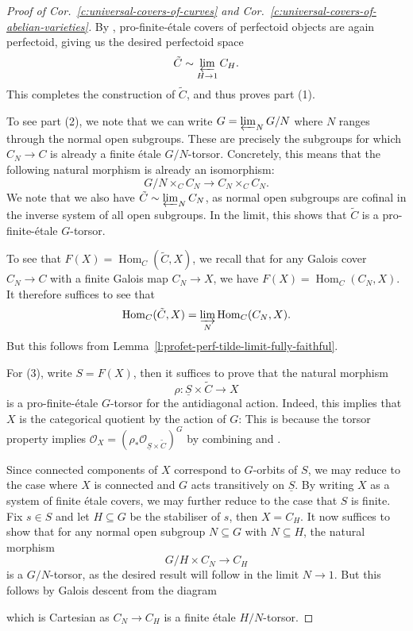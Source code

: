 \documentclass[10pt,oneside]{amsart}
\theoremstyle{definition}
\newcommand{\Hom}{\operatorname{Hom}}
\renewcommand{\O}{\mathcal{O}}
\begin{document}
\begin{proof}[Proof of Cor.~\ref{c:universal-covers-of-curves} and Cor.~\ref{c:universal-covers-of-abelian-varieties}]
By \cite[Lemma 4.6]{p-adic_Hodge}, pro-finite-\'etale covers of perfectoid objects are again perfectoid, giving us the desired perfectoid space 
\[ \tilde{C}\sim\varprojlim_{H\rightarrow 1} C_H.\]
This completes the construction of $\tilde{C}$, and thus proves part (1).

To see part (2), we note that we can write $G=\varprojlim_N G/N$ where $N$ ranges through the normal open subgroups. These are precisely the subgroups for which $C_N\to C$ is already a finite \'etale $G/N$-torsor. Concretely, this means that the following natural morphism is already an isomorphism:
\[G/N\times_C C_N\to C_N\times_CC_N.\]
We note that we also have $\tilde{C} \sim \varprojlim_NC_N$, as normal open subgroups are cofinal in the inverse system of all open subgroups. In the limit, this shows that $\tilde{C}$ is a pro-finite-\'etale $G$-torsor.

To see that $F(X)=\Hom_C(\tilde{C},X)$, we recall that for any Galois cover $C_N\to C$ with a finite Galois map $C_N\to X$, we have $F(X)=\Hom_C(C_N,X)$. It therefore suffices to see that
\[\Hom_C(\tilde{C},X)=\varinjlim_{N}\Hom_C(C_N,X).\]
But this follows from Lemma~\ref{l:profet-perf-tilde-limit-fully-faithful}.

For (3), write $S=F(X)$, then it suffices to prove that the natural morphism \[\rho:\underline{S}\times\tilde{C}\to X\]
is a pro-finite-\'etale $G$-torsor for the antidiagonal action. Indeed, this implies that $X$ is the categorical quotient by the action of $G$: This is because the torsor property implies $\O_X = (\rho_{\ast}\O_{\underline{S}\times\tilde{C}})^{G}$ by combining \cite[{Lemma~2.24}]{CHJ} and \cite[{Theorem~8.2.3}]{KedlayaLiu-II}.

 Since connected components of $X$ correspond to $G$-orbits of $S$, we may reduce to the case where $X$ is connected and $G$ acts transitively on $\underline{S}$. By writing $X$ as a system of finite \'etale covers, we may further reduce to the case that $S$ is finite.  Fix $s\in S$ and let $H\subseteq G$ be the stabiliser of $s$, then $X=C_H$. It now suffices to show that for any normal open subgroup $N\subseteq G$ with $N\subseteq H$, the natural morphism
\[G/H\times C_N\to C_H\]
is a $G/N$-torsor, as the desired result will follow in the limit $N\to 1$. But this follows by Galois descent from the diagram
\begin{center}
\end{center}
which is Cartesian as $C_N\to C_H$ is a finite \'etale $H/N$-torsor.
\end{proof}
\end{document}
